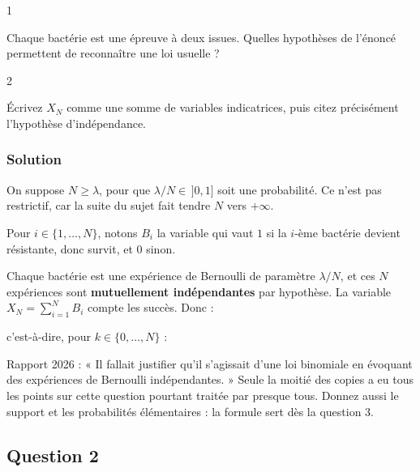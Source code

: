 \documentclass[11pt,a4paper]{article}
\newcommand{\equationajustee}[1]{%
  \sbox{\boiteequation}{$\displaystyle #1$}%
  \ifdim\wd\boiteequation>\linewidth
    \[\resizebox{\linewidth}{!}{\usebox{\boiteequation}}\]%
  \else
    \[#1\]%
  \fi}
\begin{document}
\begin{indication}{1}

Chaque bactérie est une épreuve à deux issues. Quelles hypothèses de l'énoncé permettent de reconnaître une loi usuelle ?

\end{indication}

\begin{indication}{2}

Écrivez \(X_N\) comme une somme de variables indicatrices, puis citez précisément l'hypothèse d'indépendance.

\end{indication}

\hypertarget{solution}{%
\subsubsection{Solution}\label{solution}}

On suppose \(N\ge\lambda\), pour que \(\lambda/N\in\,]0,1]\) soit une probabilité. Ce n'est pas restrictif, car la suite du sujet fait tendre \(N\) vers \(+\infty\).

Pour \(i\in\{1,\dots,N\}\), notons \(B_i\) la variable qui vaut \(1\) si la \(i\)-ème bactérie devient résistante, donc survit, et \(0\) sinon.

Chaque bactérie est une expérience de Bernoulli de paramètre \(\lambda/N\), et ces \(N\) expériences sont \textbf{mutuellement indépendantes} par hypothèse. La variable \(X_N=\sum_{i=1}^NB_i\) compte les succès. Donc :

\equationajustee{\boxed{X_N\sim\mathcal B\!\left(N,\tfrac\lambda N\right)}}

c'est-à-dire, pour \(k\in\{0,\dots,N\}\) :

\equationajustee{\boxed{\mathbb P(X_N=k)=\binom Nk\left(\frac\lambda N\right)^k\left(1-\frac\lambda N\right)^{N-k}.}}

\begin{jury}

Rapport 2026 : « Il fallait justifier qu'il s'agissait d'une loi binomiale en évoquant des expériences de Bernoulli indépendantes. » Seule la moitié des copies a eu tous les points sur cette question pourtant traitée par presque tous. Donnez aussi le support et les probabilités élémentaires : la formule sert dès la question 3.

\end{jury}

\hypertarget{question-2}{%
\subsection{Question 2}\label{question-2}}
\end{document}
